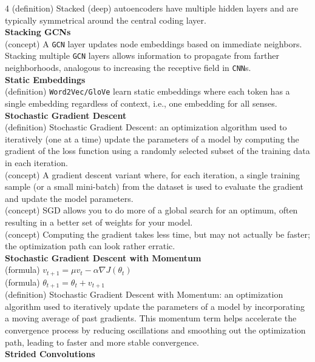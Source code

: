 \documentclass[8pt]{extarticle}
\begin{document}
\begin{multicols}{4}
(definition) Stacked (deep) autoencoders have multiple hidden layers and are typically symmetrical around the central coding layer.\\
\vspace{2pt}\textbf{Stacking GCNs}\\
(concept) A \texttt{GCN} layer updates node embeddings based on immediate neighbors. Stacking multiple \texttt{GCN} layers allows information to propagate from farther neighborhoods, analogous to increasing the receptive field in \texttt{CNN}s.\\
\vspace{2pt}\textbf{Static Embeddings}\\
(definition) \texttt{Word2Vec/GloVe} learn static embeddings where each token has a single embedding regardless of context, i.e., one embedding for all senses.\\
\vspace{2pt}\textbf{Stochastic Gradient Descent}\\
(definition) Stochastic Gradient Descent: an optimization algorithm used to iteratively (one at a time) update the parameters of a model by computing the gradient of the loss function using a randomly selected subset of the training data in each iteration.\\
(concept) A gradient descent variant where, for each iteration, a single training sample (or a small mini-batch) from the dataset is used to evaluate the gradient and update the model parameters.\\
(concept) SGD allows you to do more of a global search for an optimum, often resulting in a better set of weights for your model.\\
(concept) Computing the gradient takes less time, but may not actually be faster; the optimization path can look rather erratic.\\
\vspace{2pt}\textbf{Stochastic Gradient Descent with Momentum}\\
(formula) $v_{t+1} = \mu v_t - \alpha \nabla J(\theta_t)$\\
(formula) $\theta_{t+1} = \theta_t + v_{t+1}$\\
(definition) Stochastic Gradient Descent with Momentum: an optimization algorithm used to iteratively update the parameters of a model by incorporating a moving average of past gradients. This momentum term helps accelerate the convergence process by reducing oscillations and smoothing out the optimization path, leading to faster and more stable convergence.\\
\vspace{2pt}\textbf{Strided Convolutions}\\


\end{multicols}
\end{document}
